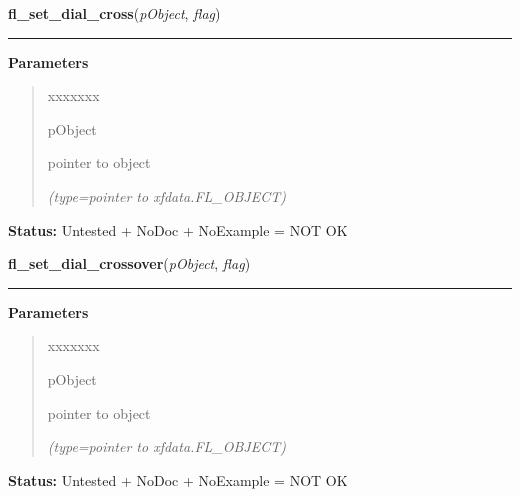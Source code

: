 \hspace{.8\funcindent}\begin{boxedminipage}{\funcwidth}

    \raggedright \textbf{fl\_set\_dial\_cross}(\textit{pObject}, \textit{flag})

    \vspace{-1.5ex}

    \rule{\textwidth}{0.5\fboxrule}
\setlength{\parskip}{2ex}
\setlength{\parskip}{1ex}
      \textbf{Parameters}
      \vspace{-1ex}

      \begin{quote}
        \begin{Ventry}{xxxxxxx}

          \item[pObject]

          pointer to object

            {\it (type=pointer to xfdata.FL\_OBJECT)}

        \end{Ventry}

      \end{quote}

\textbf{Status:} Untested + NoDoc + NoExample = NOT OK



    \end{boxedminipage}

    \label{xformslib:library:fl_set_dial_cross}

    \vspace{0.5ex}

\hspace{.8\funcindent}\begin{boxedminipage}{\funcwidth}

    \raggedright \textbf{fl\_set\_dial\_crossover}(\textit{pObject}, \textit{flag})

    \vspace{-1.5ex}

    \rule{\textwidth}{0.5\fboxrule}
\setlength{\parskip}{2ex}
\setlength{\parskip}{1ex}
      \textbf{Parameters}
      \vspace{-1ex}

      \begin{quote}
        \begin{Ventry}{xxxxxxx}

          \item[pObject]

          pointer to object

            {\it (type=pointer to xfdata.FL\_OBJECT)}

        \end{Ventry}

      \end{quote}

\textbf{Status:} Untested + NoDoc + NoExample = NOT OK



    \end{boxedminipage}

